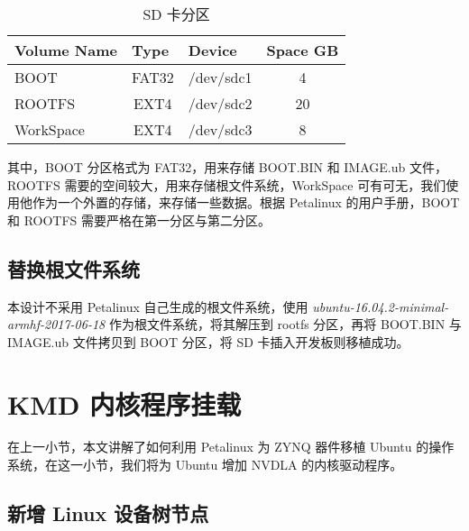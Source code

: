 \begin{table}[!htbp]
    \caption{SD 卡分区}
    \label{tab:SD Card Partition}
    \centering
    \footnotesize%
    \setlength{\tabcolsep}{4pt}%
    \renewcommand{\arraystretch}{1.2}%
    \begin{tabular}{lccc}
        \toprule
        \textbf{Volume Name} & \multicolumn{1}{l}{\textbf{Type}} & \multicolumn{1}{l}{\textbf{Device}} & \multicolumn{1}{l}{\textbf{Space GB}} \\
        \midrule
        BOOT                 & FAT32                             & /dev/sdc1                                & 4                                \\
        ROOTFS               & EXT4                              & /dev/sdc2                                & 20                               \\
        WorkSpace            & EXT4                              & /dev/sdc3                                & 8                                \\
        \bottomrule                   
    \end{tabular}
\end{table}

其中，BOOT 分区格式为 FAT32，用来存储 BOOT.BIN 和 IMAGE.ub 文件，ROOTFS 需要的空间较大，用来存储根文件系统，WorkSpace 可有可无，我们使用他作为一个外置的存储，来存储一些数据。根据 Petalinux 的用户手册，BOOT 和 ROOTFS 需要严格在第一分区与第二分区。

\subsection{替换根文件系统}

本设计不采用 Petalinux 自己生成的根文件系统，使用 \emph{ubuntu-16.04.2-minimal-armhf-2017-06-18} 作为根文件系统，将其解压到 rootfs 分区，再将 BOOT.BIN 与 IMAGE.ub 文件拷贝到 BOOT 分区，将 SD 卡插入开发板则移植成功。

\section{KMD 内核程序挂载}

在上一小节，本文讲解了如何利用 Petalinux 为 ZYNQ 器件移植 Ubuntu 的操作系统，在这一小节，我们将为 Ubuntu 增加 NVDLA 的内核驱动程序。

\subsection{新增 Linux 设备树节点}

